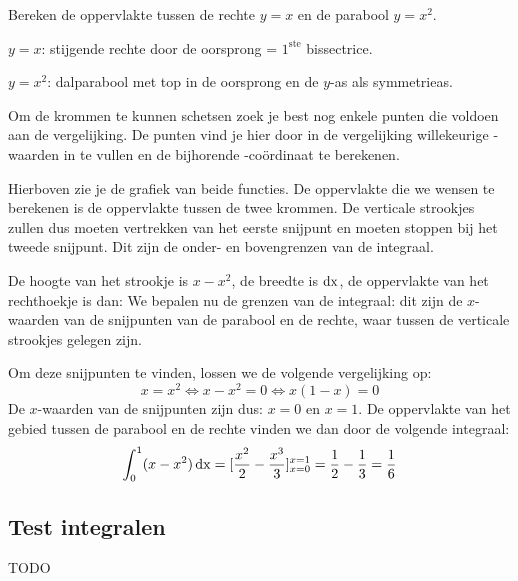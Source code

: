 \begin{voorbeeld}
	Bereken de oppervlakte tussen de rechte $y=x$ en de parabool $y=x^2$.
	
$y=x$: stijgende rechte door de oorsprong = $1^{\text{ste}}$ bissectrice.

$y=x^2$: dalparabool met top in de oorsprong en de $y$-as als symmetrieas.

Om de krommen te kunnen schetsen zoek je best nog enkele punten die voldoen aan de vergelijking. De punten vind je hier door in de vergelijking willekeurige -waarden in te vullen en de bijhorende -coördinaat te berekenen.

Hierboven zie je de grafiek van beide functies. De oppervlakte die we wensen te berekenen is de oppervlakte tussen de twee krommen. De verticale strookjes zullen dus moeten vertrekken van het eerste snijpunt en moeten stoppen bij het tweede snijpunt. Dit zijn de onder- en bovengrenzen van de integraal.

De hoogte van het strookje is $x-x^2$, de breedte is $\operatorname{dx}$, de oppervlakte van het rechthoekje is dan: 
We bepalen nu de grenzen van de integraal: dit zijn de $x$-waarden van de snijpunten van de parabool en de rechte, waar tussen de verticale strookjes gelegen zijn.

Om deze snijpunten te vinden, lossen we de volgende vergelijking op:
\begin{equation*}
x=x^2 \iff x-x^2=0 \iff x(1-x)=0
\end{equation*}
De $x$-waarden van de snijpunten zijn dus: $x=0$ en $x=1$. 
De oppervlakte van het gebied tussen de parabool en de rechte vinden we dan door de volgende integraal:
\begin{equation*}
\int_{0}^{1} (x-x^2)\operatorname{dx} = [\frac{x^2}{2}-\frac{x^3}{3}]_{x=0}^{x=1}=\frac{1}{2}-\frac{1}{3}=\frac{1}{6}
\end{equation*}
\end{voorbeeld}


\subsection{Test integralen}
TODO